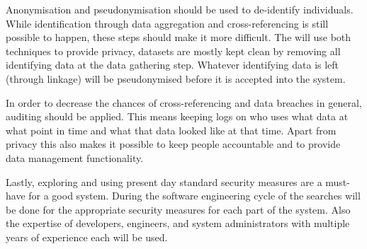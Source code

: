 Anonymisation and pseudonymisation should be used to de-identify individuals.
While identification through data aggregation and cross-referencing is still possible to happen, these steps should make it more difficult.
The \ivfsystem{} will use both techniques to provide privacy, datasets are mostly kept clean by removing all identifying data at the data gathering step.
Whatever identifying data is left (through linkage) will be pseudonymised before it is accepted into the system.

In order to decrease the chances of cross-referencing and data breaches in general, auditing should be applied.
This means keeping logs on who uses what data at what point in time and what that data looked like at that time.
Apart from privacy this also makes it possible to keep people accountable and to provide data management functionality.

Lastly, exploring and using present day standard security measures are a must-have for a good system.
During the software engineering cycle of the \ivfsystem{} searches will be done for the appropriate security measures for each part of the system.
Also the expertise of developers, engineers, and system administrators with multiple years of experience each will be used.